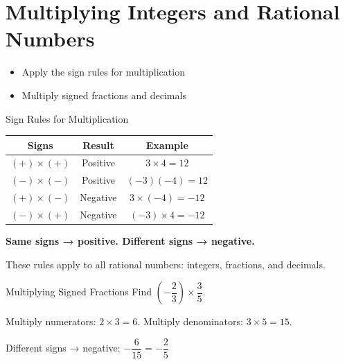 \section{Multiplying Integers and Rational Numbers}

\begin{learningGoals}
\begin{itemize}
    \item Apply the sign rules for multiplication
    \item Multiply signed fractions and decimals
\end{itemize}
\end{learningGoals}

\begin{conceptBox}{Sign Rules for Multiplication}
\begin{center}
\begin{tabular}{c c c}
    \textbf{Signs} & \textbf{Result} & \textbf{Example} \\
    \hline
    $(+) \times (+)$ & Positive & $3 \times 4 = 12$ \\
    $(-) \times (-)$ & Positive & $(-3)(-4) = 12$ \\
    $(+) \times (-)$ & Negative & $3 \times (-4) = -12$ \\
    $(-) \times (+)$ & Negative & $(-3) \times 4 = -12$ \\
\end{tabular}
\end{center}
\textbf{Same signs → positive. Different signs → negative.}

These rules apply to all rational numbers: integers, fractions, and decimals.
\end{conceptBox}

\begin{workedExample}{Multiplying Signed Fractions}
Find $\left(-\dfrac{2}{3}\right) \times \dfrac{3}{5}$.

Multiply numerators: $2 \times 3 = 6$. Multiply denominators: $3 \times 5 = 15$.

Different signs → negative: $-\dfrac{6}{15} = -\dfrac{2}{5}$
\end{workedExample}


